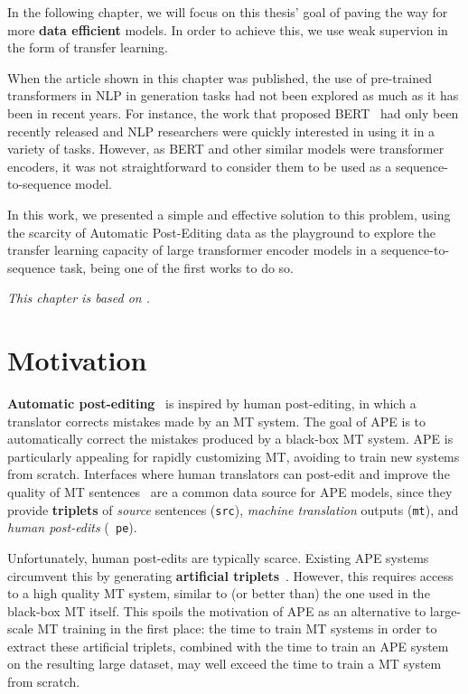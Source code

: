 \label{cap:ape}

In the following chapter, we will focus on this thesis' goal of
paving the way for more \textbf{data efficient} models. In order to
achieve this, we use weak supervion in the form of transfer learning.

When the article shown in this chapter was published, the use of
pre-trained transformers %
in NLP in generation tasks had not been explored as much as it has
been in recent years. %
For instance, the work that proposed
BERT~\citep{devlin2018bert} had only been recently released and NLP
researchers were quickly interested in using it in a variety of
tasks. However, as BERT and other similar models were transformer
encoders, it was not straightforward to consider them to be used
as a sequence-to-sequence model. %

In this work, we presented a simple and effective
solution to this problem, using the scarcity of Automatic Post-Editing
data as the playground to explore the transfer learning capacity of
large transformer encoder models in a sequence-to-sequence task,
being one of the first works to do so.

\emph{This chapter is based on \citet{Correia2019}.}

\section{Motivation}

 {\bf Automatic post-editing}~\citep[APE;][]{simard2007rule} is
inspired by human post-editing, in which a translator corrects
mistakes made by an MT system.
The goal of APE is to automatically correct the mistakes produced by
a black-box MT system. APE is particularly
appealing for rapidly customizing MT, avoiding to train new systems
from scratch. Interfaces where human translators can post-edit and
improve the quality of MT
sentences~\citep{Alabau2014,Federico2014,Denkowski2015,Hokamp2018}
are a common data source for APE models, since they provide {\bf
    triplets} of {\it source} sentences ({\tt src}), {\it machine
    translation} outputs ({\tt mt}), and {\it human post-edits} ({\tt
    pe}).

Unfortunately, human post-edits are typically scarce. Existing APE
systems circumvent this by generating {\bf artificial
    triplets}~\citep{junczys2016log, negri2018escape}. However, this
requires access to a high quality MT system, similar to (or better
than) the one used in the black-box MT itself. This spoils the
motivation of APE as an alternative to large-scale MT training in the
first place: the time to train MT systems in order to extract these
artificial triplets, combined with the time to train an APE system on
the resulting large dataset, may well exceed the time to train a MT
system from scratch.


